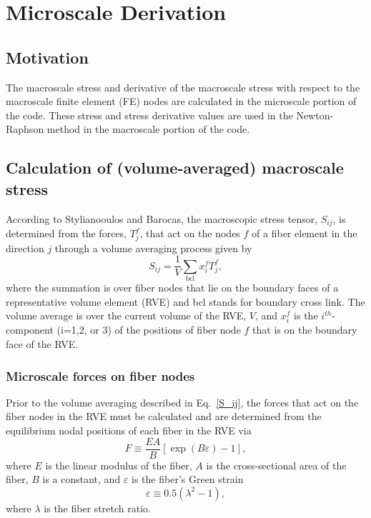 \chapter{Microscale Derivation}
\section{Motivation}
The macroscale stress and derivative of the macroscale stress with respect to the macroscale finite element (FE) nodes are calculated in the microscale portion of the code. These stress and stress derivative values are used in the Newton-Raphson method in the macroscale portion of the code.

\section{Calculation of (volume-averaged) macroscale stress}
\label{sec:macrostress}

According to Stylianooulos and Barocas, the macroscopic stress tensor, $S_{ij}$, is determined from the forces, $T_j^f$, that act on the nodes $f$ of a fiber element in the direction $j$ through a volume averaging process given by
%
\begin{equation}
S_{ij} = \frac{1}{V} \sum_{\text{bcl}} x_i^f T_j^f,
\label{S_ij}
\end{equation}
%
where the summation is over fiber nodes that lie on the boundary faces of a representative volume element (RVE) and bcl stands for boundary cross link. The volume average is over the current volume of the RVE, $V$, and $x_i^f$ is the $i^{th}$-component (i=1,2, or 3) of the positions of fiber node $f$ that is on the boundary face of the RVE.

\subsection{Microscale forces on fiber nodes}

Prior to the volume averaging described in Eq.\ \eqref{S_ij}, the forces that act on the fiber nodes in the RVE must be calculated and are determined from the equilibrium nodal positions of each fiber in the RVE via 
%
\begin{equation}
F \equiv \frac{E A}{B}[\exp(B \varepsilon) - 1],
\label{fiber_force}
\end{equation}
%
where $E$ is the linear modulus of the fiber, $A$ is the cross-sectional area of the fiber, $B$ is a constant, and $\varepsilon$ is the fiber's Green strain
%
\begin{equation}
\varepsilon \equiv 0.5 \left(\lambda^2-1\right),
\label{Green_strain}
\end{equation}
% 
where $\lambda$ is the fiber stretch ratio.

